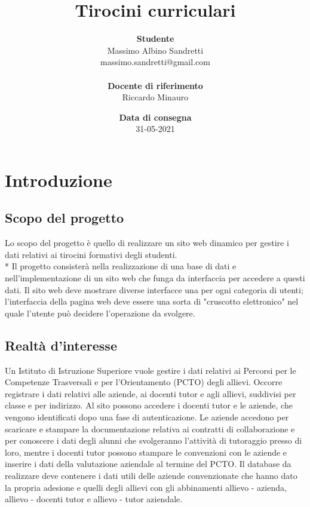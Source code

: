 \documentclass[12pt]{article}
\title{Tirocini curriculari}
\author{\textbf{Studente}\\
Massimo Albino Sandretti\\
massimo.sandretti@gmail.com\\\\
\textbf{Docente di riferimento}\\
Riccardo Minauro}
\date{\textbf{Data di consegna}\\31-05-2021}
\begin{document}
\maketitle


\tableofcontents
\newpage

\section{Introduzione}
\subsection{Scopo del progetto}
Lo scopo del progetto è quello di realizzare un sito web dinamico per gestire i dati relativi ai tirocini formativi degli studenti.\\*
Il progetto consisterà nella realizzazione di una base di dati e nell'implementazione di un sito web che funga da interfaccia per accedere a questi dati.
Il sito web deve mostrare diverse interfacce una per ogni categoria di utenti; l'interfaccia della pagina web deve
essere una sorta di "cruscotto elettronico" nel quale l'utente può decidere l'operazione da svolgere.
\subsection{Realtà d'interesse}
Un Istituto di Istruzione Superiore vuole gestire i dati relativi ai Percorsi per le Competenze Trasversali e per
l’Orientamento (PCTO) degli allievi.
Occorre registrare i dati relativi alle aziende, ai docenti tutor e agli allievi, suddivisi per classe e per indirizzo.
Al sito possono accedere i docenti tutor e le aziende, che vengono identificati dopo una fase di autenticazione.
Le aziende accedono per scaricare e stampare la documentazione relativa ai contratti di collaborazione e per
conoscere i dati degli alunni che svolgeranno l'attività di tutoraggio presso di loro, mentre i docenti tutor
possono stampare le convenzioni con le aziende e inserire i dati della valutazione aziendale al termine del
PCTO.
Il database da realizzare deve contenere i dati utili delle aziende convenzionate che hanno dato la propria
adesione e quelli degli allievi con gli abbinamenti allievo - azienda, allievo - docenti tutor e allievo - tutor
aziendale.
\end{document}
